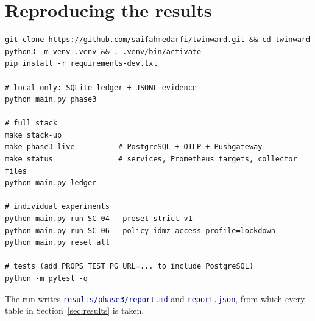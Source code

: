 \documentclass[11pt]{article}
\newcommand{\file}[1]{\textcolor{navy}{\texttt{\small #1}}}
\begin{document}
\appendix
\section{Reproducing the results}
\label{app:repro}
\begin{verbatim}
git clone https://github.com/saifahmedarfi/twinward.git && cd twinward
python3 -m venv .venv && . .venv/bin/activate
pip install -r requirements-dev.txt

# local only: SQLite ledger + JSONL evidence
python main.py phase3

# full stack
make stack-up
make phase3-live          # PostgreSQL + OTLP + Pushgateway
make status               # services, Prometheus targets, collector files
python main.py ledger

# individual experiments
python main.py run SC-04 --preset strict-v1
python main.py run SC-06 --policy idmz_access_profile=lockdown
python main.py reset all

# tests (add PROPS_TEST_PG_URL=... to include PostgreSQL)
python -m pytest -q
\end{verbatim}
The run writes \file{results/phase3/report.md} and \file{report.json}, from which
every table in Section~\ref{sec:results} is taken.

\end{document}
